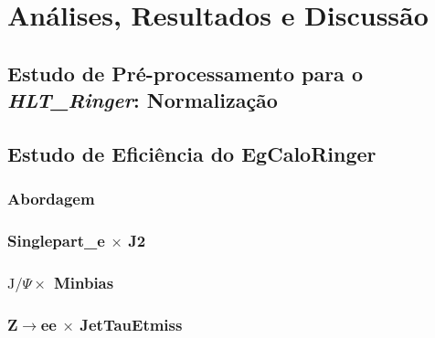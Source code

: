 \chapter{Análises, Resultados e Discussão}
\label{cap:resultados}



\section{Estudo de Pré-processamento para o \emph{HLT\_Ringer}: Normalização}
\label{sec:norm}


\section{Estudo de Eficiência do EgCaloRinger}
\label{sec:efic_egcalo}

\subsection{Abordagem} %
\label{ssec:abordagem}

\subsection{\texorpdfstring{Singlepart\_e $\times$ J2}{Singlepart\_e x J2}}
\label{ssec:single_e}


\subsection{\texorpdfstring{$\text{J}/\Psi \times$ Minbias}{JPsi x Minbias}}
\label{ssec:jpsi}


\subsection{\texorpdfstring{Z$\rightarrow$ee $\times$ JetTauEtmiss}{Zee x
JetTauEtMiss}}
\label{ssec:Zee}




